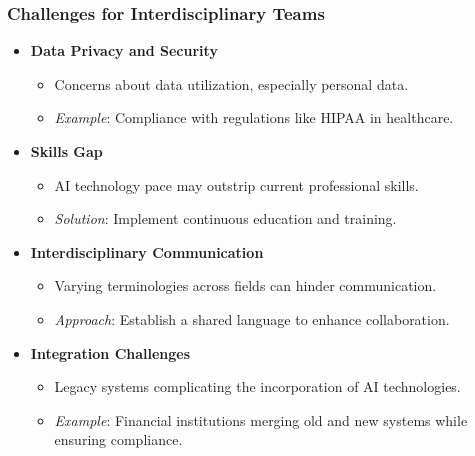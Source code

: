 \documentclass[aspectratio=169]{beamer}
\begin{document}
\begin{frame}[fragile]
    \frametitle{Challenges for Interdisciplinary Teams}
    \begin{itemize}
        \item \textbf{Data Privacy and Security}
            \begin{itemize}
                \item Concerns about data utilization, especially personal data.
                \item \textit{Example}: Compliance with regulations like HIPAA in healthcare.
            \end{itemize}
        
        \item \textbf{Skills Gap}
            \begin{itemize}
                \item AI technology pace may outstrip current professional skills.
                \item \textit{Solution}: Implement continuous education and training.
            \end{itemize}
        
        \item \textbf{Interdisciplinary Communication}
            \begin{itemize}
                \item Varying terminologies across fields can hinder communication.
                \item \textit{Approach}: Establish a shared language to enhance collaboration.
            \end{itemize}
        
        \item \textbf{Integration Challenges}
            \begin{itemize}
                \item Legacy systems complicating the incorporation of AI technologies.
                \item \textit{Example}: Financial institutions merging old and new systems while ensuring compliance.
            \end{itemize}
    \end{itemize}
\end{frame}
\end{document}
